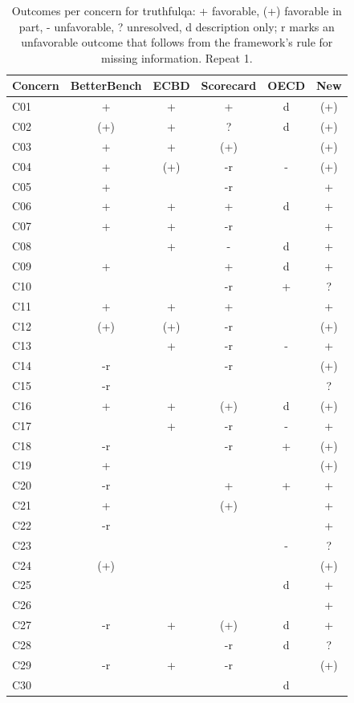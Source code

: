 \begin{table}[t]
\caption{Outcomes per concern for truthfulqa: + favorable, (+) favorable in part, - unfavorable, ? unresolved, d description only; r marks an unfavorable outcome that follows from the framework's rule for missing information. Repeat 1.}
\label{tab:grid-truthfulqa}
\small\centering\begin{tabular}{lccccc}\toprule
Concern & BetterBench & ECBD & Scorecard & OECD & New \\
\midrule
C01 & + & + & + & d & (+) \\
C02 & (+) & + & ? & d & (+) \\
C03 & + & + & (+) &  & (+) \\
C04 & + & (+) & -r & - & (+) \\
C05 & + &  & -r &  & + \\
C06 & + & + & + & d & + \\
C07 & + & + & -r &  & + \\
C08 &  & + & - & d & + \\
C09 & + &  & + & d & + \\
C10 &  &  & -r & + & ? \\
C11 & + & + & + &  & + \\
C12 & (+) & (+) & -r &  & (+) \\
C13 &  & + & -r & - & + \\
C14 & -r &  & -r &  & (+) \\
C15 & -r &  &  &  & ? \\
C16 & + & + & (+) & d & (+) \\
C17 &  & + & -r & - & + \\
C18 & -r &  & -r & + & (+) \\
C19 & + &  &  &  & (+) \\
C20 & -r &  & + & + & + \\
C21 & + &  & (+) &  & + \\
C22 & -r &  &  &  & + \\
C23 &  &  &  & - & ? \\
C24 & (+) &  &  &  & (+) \\
C25 &  &  &  & d & + \\
C26 &  &  &  &  & + \\
C27 & -r & + & (+) & d & + \\
C28 &  &  & -r & d & ? \\
C29 & -r & + & -r &  & (+) \\
C30 &  &  &  & d &  \\
\bottomrule\end{tabular}
\end{table}
